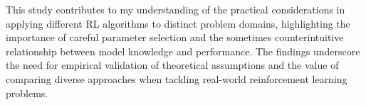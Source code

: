 \documentclass[conference]{IEEEtran}
\begin{document}
This study contributes to my understanding of the practical considerations in applying different RL algorithms to distinct problem domains, highlighting the importance of careful parameter selection and the sometimes counterintuitive relationship between model knowledge and performance. The findings underscore the need for empirical validation of theoretical assumptions and the value of comparing diverse approaches when tackling real-world reinforcement learning problems.

\end{document}

